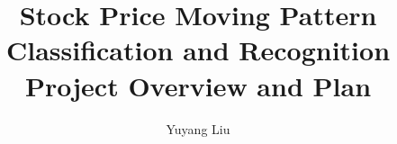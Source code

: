 \documentclass[11pt]{report}
\begin{document}
\title{Stock Price Moving Pattern Classification and Recognition \\ Project Overview and Plan}

\author{Yuyang Liu}

\normallinespacing
\maketitle



\body







\end{document}
